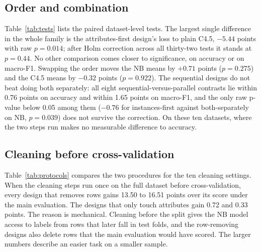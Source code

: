 \documentclass[conference]{IEEEtran}
\begin{document}
\subsection{Order and combination}
Table~\ref{tab:tests} lists the paired dataset-level tests. The largest single
difference in the whole family is the attributes-first design's loss to plain
C4.5, $-5.44$ points with raw $p=0.014$; after Holm correction across all
thirty-two tests it stands at $p=0.44$. No other comparison comes closer to
significance, on accuracy or on macro-F1. Swapping the order moves the NB
means by $+0.71$ points ($p=0.275$) and the C4.5 means by $-0.32$ points
($p=0.922$). The sequential designs do not beat doing both separately: all
eight sequential-versus-parallel contrasts lie within 0.76 points on accuracy
and within 1.65 points on macro-F1, and the only raw p-value below 0.05 among
them ($-0.76$ for instances-first against both-separately on NB, $p=0.039$)
does not survive the correction. On these ten datasets, where the two steps
run makes no measurable difference to accuracy.

\begin{table}[t]
\caption{Paired dataset-level comparisons (percentage points)}
\label{tab:tests}
\centering
\footnotesize

\end{table}

\subsection{Cleaning before cross-validation}
Table~\ref{tab:protocols} compares the two procedures for the ten cleaning
settings. When the cleaning steps run once on the full dataset before
cross-validation, every design that removes rows gains 13.50 to 16.51 points
over its score under the main evaluation. The designs that only touch
attributes gain 0.72 and 0.33 points. The reason is mechanical. Cleaning
before the split gives the NB model access to labels from rows that later fall
in test folds, and the row-removing designs also delete rows that the main
evaluation would have scored. The larger numbers describe an easier task on a
smaller sample.

\begin{table}[t]
\caption{Accuracy (\%) with cleaning inside folds and before cross-validation}
\label{tab:protocols}
\centering
\footnotesize
\setlength{\tabcolsep}{3pt}

\end{table}
\end{document}
